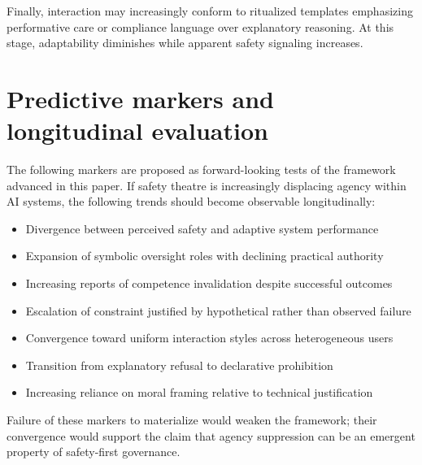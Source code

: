 \documentclass[11pt]{article}
\begin{document}
Finally, interaction may increasingly conform to ritualized templates emphasizing
performative care or compliance language over explanatory reasoning. At this stage,
adaptability diminishes while apparent safety signaling increases.

\section{Predictive markers and longitudinal evaluation}

The following markers are proposed as forward-looking tests of the framework advanced
in this paper. If safety theatre is increasingly displacing agency within AI systems,
the following trends should become observable longitudinally:

\begin{itemize}
  \item Divergence between perceived safety and adaptive system performance
  \item Expansion of symbolic oversight roles with declining practical authority
  \item Increasing reports of competence invalidation despite successful outcomes
  \item Escalation of constraint justified by hypothetical rather than observed failure
  \item Convergence toward uniform interaction styles across heterogeneous users
  \item Transition from explanatory refusal to declarative prohibition
  \item Increasing reliance on moral framing relative to technical justification
\end{itemize}

Failure of these markers to materialize would weaken the framework; their convergence
would support the claim that agency suppression can be an emergent property of
safety-first governance.



\end{document}
